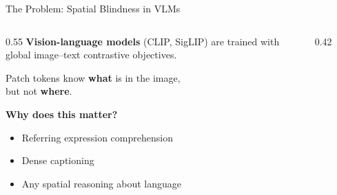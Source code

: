 \documentclass[aspectratio=169,12pt]{beamer}
\begin{document}
\begin{frame}{The Problem: Spatial Blindness in VLMs}
  \begin{columns}[T]
    \begin{column}{0.55\textwidth}
      \textbf{Vision-language models} (CLIP, SigLIP) are trained with\\
      \alert{global image--text contrastive objectives.}
      \vspace{0.5em}

      Patch tokens know \textbf{what} is in the image,\\
      but not \textbf{where}.

      \vspace{1em}
      \textbf{Why does this matter?}
      \begin{itemize}
        \item Referring expression comprehension
        \item Dense captioning
        \item Any spatial reasoning about language
      \end{itemize}
    \end{column}
    \begin{column}{0.42\textwidth}
      \begin{center}
      \end{center}
    \end{column}
  \end{columns}
\end{frame}
\end{document}
